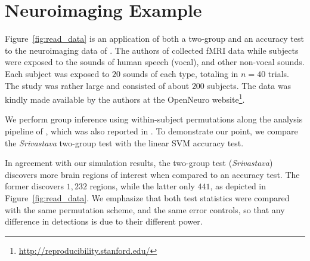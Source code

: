 \documentclass[journal]{IEEEtran}
\begin{document}
\section{Neuroimaging Example}
\label{sec:example}

Figure~\ref{fig:read_data} is an application of both a two-group and an accuracy test to the neuroimaging data of \cite{pernet_human_2015}. 
The authors of \cite{pernet_human_2015} collected fMRI data while subjects were exposed to the sounds of human speech (vocal), and other non-vocal sounds. 
Each subject was exposed to $20$ sounds of each type, totaling in $n=40$ trials.
The study was rather large and consisted of about $200$ subjects.
The data was kindly made available by the authors at the OpenNeuro website\footnote{\url{http://reproducibility.stanford.edu/}}.

We perform group inference using within-subject permutations along the analysis pipeline of \cite{stelzer_statistical_2013}, which was also reported in \cite{gilron_quantifying_2016}. 
To demonstrate our point, we compare the \emph{Srivastava} two-group test with the linear SVM accuracy test. 

In agreement with our simulation results, the two-group test (\emph{Srivastava}) discovers more brain regions of interest when compared to an accuracy test.
The former discovers $1,232$ regions, while the latter only $441$, as depicted in Figure~\ref{fig:read_data}.
We emphasize that both test statistics were compared with the same permutation scheme, and the same error controls, so that any difference in detections is due to their different power.
\end{document}
